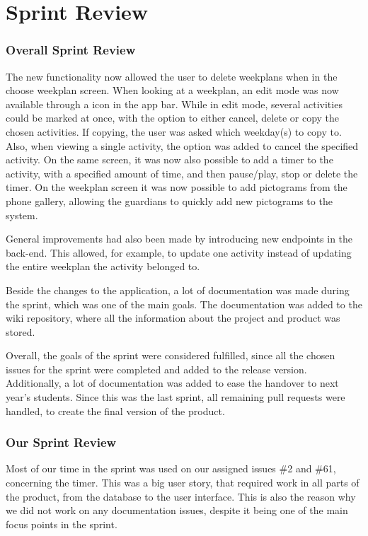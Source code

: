 \section{Sprint Review}

\subsubsection{Overall Sprint Review}
The new functionality now allowed the user to delete weekplans when in the choose weekplan screen. When looking at a weekplan, an edit mode was now available through a icon in the app bar. While in edit mode, several activities could be marked at once, with the option to either cancel, delete or copy the chosen activities. If copying, the user was asked which weekday(s) to copy to. Also, when viewing a single activity, the option was added to cancel the specified activity. On the same screen, it was now also possible to add a timer to the activity, with a specified amount of time, and then pause/play, stop or delete the timer. On the weekplan screen it was now possible to add pictograms from the phone gallery, allowing the guardians to quickly add new pictograms to the system.  

General improvements had also been made by introducing new endpoints in the back-end. This allowed, for example, to update one activity instead of updating the entire weekplan the activity belonged to. 

Beside the changes to the application, a lot of documentation was made during the sprint, which was one of the main goals. The documentation was added to the wiki repository, where all the information about the project and product was stored. 

Overall, the goals of the sprint were considered fulfilled, since all the chosen issues for the sprint were completed and added to the release version. Additionally, a lot of documentation was added to ease the handover to next year's students. Since this was the last sprint, all remaining pull requests were handled, to create the final version of the product. 

\subsubsection{Our Sprint Review}
Most of our time in the sprint was used on our assigned issues \#2 and \#61, concerning the timer. This was a big user story, that required work in all parts of the product, from the database to the user interface. This is also the reason why we did not work on any documentation issues, despite it being one of the main focus points in the sprint. 

